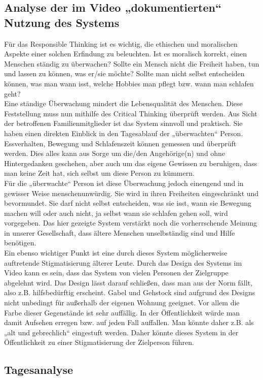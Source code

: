 \subsection{Analyse der im Video „dokumentierten“ Nutzung des Systems}
Für das Responsible Thinking ist es wichtig, die ethischen und moralischen Aspekte einer solchen Erfindung zu beleuchten. 
Ist es moralisch korrekt, einen Menschen ständig zu überwachen? Sollte ein Mensch nicht die Freiheit haben, tun und lassen zu können, was er/sie möchte? Sollte man nicht selbst entscheiden können, was man wann isst, welche Hobbies man pflegt bzw. wann man schlafen geht? \\
Eine ständige Überwachung mindert die Lebensqualität des Menschen. Diese Feststellung muss nun mithilfe des Critical Thinking überprüft werden. Aus Sicht der betroffenen Familienmitglieder ist das System sinnvoll und praktisch. Sie haben einen direkten Einblick in den Tagesablauf der „überwachten“ Person. Essverhalten, Bewegung und Schlafenszeit können gemessen und überprüft werden. Dies alles kann aus Sorge um die/den Angehörige(n) und ohne Hintergedanken geschehen, aber auch um das eigene Gewissen zu beruhigen, dass man keine Zeit hat, sich selbst um diese Person zu kümmern. \\
Für die „überwachte“ Person ist diese Überwachung jedoch einengend und in gewisser Weise menschenunwürdig. Sie wird in ihren Freiheiten eingeschränkt und bevormundet. Sie darf nicht selbst entscheiden, was sie isst, wann sie Bewegung machen will oder auch nicht, ja selbst wann sie schlafen gehen soll, wird vorgegeben. Das hier gezeigte System verstärkt noch die vorherrschende Meinung in unserer Gesellschaft, dass ältere Menschen unselbständig sind und Hilfe benötigen. \\
Ein ebenso wichtiger Punkt ist eine durch dieses System möglicherweise auftretende Stigmatisierung älterer Leute. Durch das Design des Systems im Video kann es sein, dass das System von vielen Personen der Zielgruppe abgelehnt wird. Das Design lässt darauf schließen, dass man aus der Norm fällt, also z.B. hilfsbedürftig erscheint. Gabel und Gehstock sind aufgrund des Designs nicht unbedingt für außerhalb der eigenen Wohnung geeignet. Vor allem die Farbe dieser Gegenstände ist sehr auffällig. In der Öffentlichkeit würde man damit Aufsehen erregen bzw. auf jeden Fall auffallen. Man könnte daher z.B. als „alt und gebrechlich“ eingestuft werden. Daher könnte dieses System in der Öffentlichkeit zu einer Stigmatisierung der Zielperson führen.

\subsection{Tagesanalyse}
